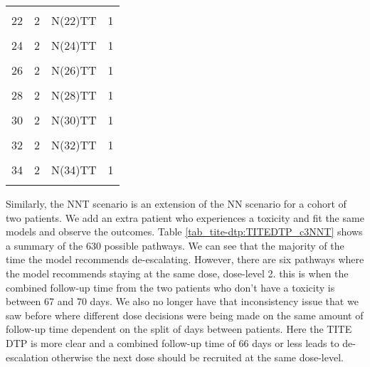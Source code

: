 \begin{table}[H]
{\begin{tabular}[t]{cccc}
			\cellcolor{gray!6}{21} & \cellcolor{gray!6}{2} & \cellcolor{gray!6}{N(21)TT} & \cellcolor{gray!6}{1}\\
			22 & 2 & N(22)TT & 1\\
			\cellcolor{gray!6}{23} & \cellcolor{gray!6}{2} & \cellcolor{gray!6}{N(23)TT} & \cellcolor{gray!6}{1}\\
			24 & 2 & N(24)TT & 1\\
			\cellcolor{gray!6}{25} & \cellcolor{gray!6}{2} & \cellcolor{gray!6}{N(25)TT} & \cellcolor{gray!6}{1}\\
			26 & 2 & N(26)TT & 1\\
			\cellcolor{gray!6}{27} & \cellcolor{gray!6}{2} & \cellcolor{gray!6}{N(27)TT} & \cellcolor{gray!6}{1}\\
			28 & 2 & N(28)TT & 1\\
			\cellcolor{gray!6}{29} & \cellcolor{gray!6}{2} & \cellcolor{gray!6}{N(29)TT} & \cellcolor{gray!6}{1}\\
			30 & 2 & N(30)TT & 1\\
			\cellcolor{gray!6}{31} & \cellcolor{gray!6}{2} & \cellcolor{gray!6}{N(31)TT} & \cellcolor{gray!6}{1}\\
			32 & 2 & N(32)TT & 1\\
			\cellcolor{gray!6}{33} & \cellcolor{gray!6}{2} & \cellcolor{gray!6}{N(33)TT} & \cellcolor{gray!6}{1}\\
			34 & 2 & N(34)TT & 1\\
			\cellcolor{gray!6}{35} & \cellcolor{gray!6}{2} & \cellcolor{gray!6}{NTT} & \cellcolor{gray!6}{1}\\
			\bottomrule
	\end{tabular}}
\end{table}

Similarly, the NNT scenario is an extension of the NN scenario for a cohort of two patients. We add an extra patient who experiences a toxicity and fit the same models and observe the outcomes. Table \ref{tab_tite-dtp:TITEDTP_c3NNT} shows a summary of the 630 possible pathways. We can see that the majority of the time the model recommends de-escalating. However, there are six pathways where the model recommends staying at the same dose, dose-level 2. this is when the combined follow-up time from the two patients who don't have a toxicity is between 67 and 70 days. We also no longer have that inconsistency issue that we saw before where different dose decisions were being made on the same amount of follow-up time dependent on the split of days between patients. Here the TITE DTP is more clear and a combined follow-up time of 66 days or less leads to de-escalation otherwise the next dose should be recruited at the same dose-level.

